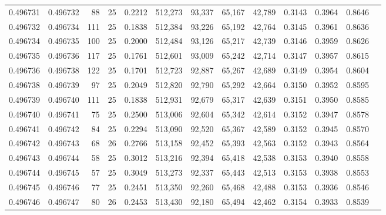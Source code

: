 \begin{tabular}{rrrrrrrrrrrrr}
0.496731 & 0.496732 &    88 &  25 &                                     0.2212 & 512,273 &  93,337 &  65,167 &  42,789 & 0.3143 & 0.3964 & 0.8646 \\
0.496732 & 0.496734 &   111 &  25 &                                     0.1838 & 512,384 &  93,226 &  65,192 &  42,764 & 0.3145 & 0.3961 & 0.8636 \\
0.496734 & 0.496735 &   100 &  25 &                                     0.2000 & 512,484 &  93,126 &  65,217 &  42,739 & 0.3146 & 0.3959 & 0.8626 \\
0.496735 & 0.496736 &   117 &  25 &                                     0.1761 & 512,601 &  93,009 &  65,242 &  42,714 & 0.3147 & 0.3957 & 0.8615 \\
0.496736 & 0.496738 &   122 &  25 &                                     0.1701 & 512,723 &  92,887 &  65,267 &  42,689 & 0.3149 & 0.3954 & 0.8604 \\
0.496738 & 0.496739 &    97 &  25 &                                     0.2049 & 512,820 &  92,790 &  65,292 &  42,664 & 0.3150 & 0.3952 & 0.8595 \\
0.496739 & 0.496740 &   111 &  25 &                                     0.1838 & 512,931 &  92,679 &  65,317 &  42,639 & 0.3151 & 0.3950 & 0.8585 \\
0.496740 & 0.496741 &    75 &  25 &                                     0.2500 & 513,006 &  92,604 &  65,342 &  42,614 & 0.3152 & 0.3947 & 0.8578 \\
0.496741 & 0.496742 &    84 &  25 &                                     0.2294 & 513,090 &  92,520 &  65,367 &  42,589 & 0.3152 & 0.3945 & 0.8570 \\
0.496742 & 0.496743 &    68 &  26 &                                     0.2766 & 513,158 &  92,452 &  65,393 &  42,563 & 0.3152 & 0.3943 & 0.8564 \\
0.496743 & 0.496744 &    58 &  25 &                                     0.3012 & 513,216 &  92,394 &  65,418 &  42,538 & 0.3153 & 0.3940 & 0.8558 \\
0.496744 & 0.496745 &    57 &  25 &                                     0.3049 & 513,273 &  92,337 &  65,443 &  42,513 & 0.3153 & 0.3938 & 0.8553 \\
0.496745 & 0.496746 &    77 &  25 &                                     0.2451 & 513,350 &  92,260 &  65,468 &  42,488 & 0.3153 & 0.3936 & 0.8546 \\
0.496746 & 0.496747 &    80 &  26 &                                     0.2453 & 513,430 &  92,180 &  65,494 &  42,462 & 0.3154 & 0.3933 & 0.8539 \\

\end{tabular}
